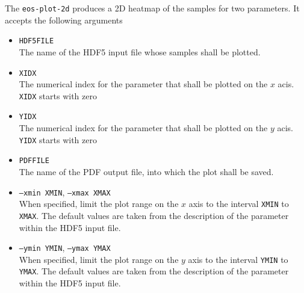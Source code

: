 The \texttt{eos-plot-2d} produces a 2D heatmap of the samples for two parameters.
It accepts the following arguments
\begin{itemize}
    \item[] \texttt{HDF5FILE}\\[\medskipamount]
        The name of the HDF5 input file whose samples shall be plotted.

    \item[] \texttt{XIDX}\\[\medskipamount]
        The numerical index for the parameter that shall be plotted on the
        $x$ acis. \texttt{XIDX} starts with zero

    \item[] \texttt{YIDX}\\[\medskipamount]
        The numerical index for the parameter that shall be plotted on the
        $y$ acis. \texttt{YIDX} starts with zero

    \item[] \texttt{PDFFILE}\\[\medskipamount]
        The name of the PDF output file, into which the plot shall be saved.

    \item[] \texttt{--xmin XMIN}, \texttt{--xmax XMAX}\\[\medskipamount]
        When specified, limit the plot range on the $x$ axis to the interval
        \texttt{XMIN} to \texttt{XMAX}. The default values are taken from the
        description of the parameter within the HDF5 input file.

    \item[] \texttt{--ymin YMIN}, \texttt{--ymax YMAX}\\[\medskipamount]
        When specified, limit the plot range on the $y$ axis to the interval
        \texttt{YMIN} to \texttt{YMAX}. The default values are taken from the
        description of the parameter within the HDF5 input file.
\end{itemize}

%
